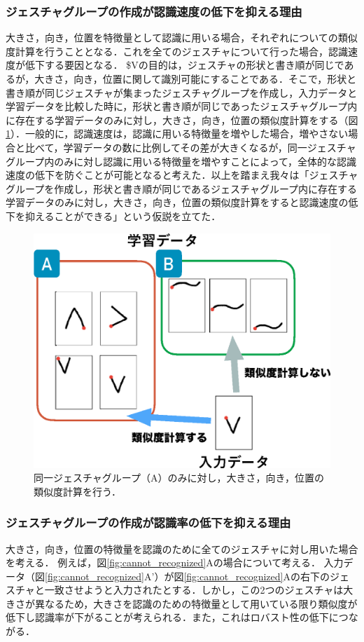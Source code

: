 \subsubsection{ジェスチャグループの作成が認識速度の低下を抑える理由}

大きさ，向き，位置を特徴量として認識に用いる場合，それぞれについての類似度計算を行うこととなる．これを全てのジェスチャについて行った場合，認識速度が低下する要因となる．
\$Vの目的は，ジェスチャの形状と書き順が同じであるが，大きさ，向き，位置に関して識別可能にすることである．そこで，形状と書き順が同じジェスチャが集まったジェスチャグループを作成し，入力データと学習データを比較した時に，形状と書き順が同じであったジェスチャグループ内に存在する学習データのみに対し，大きさ，向き，位置の類似度計算をする（図\ref{fig:speed_reason}）．一般的に，認識速度は，認識に用いる特徴量を増やした場合，増やさない場合と比べて，学習データの数に比例してその差が大きくなるが，同一ジェスチャグループ内のみに対し認識に用いる特徴量を増やすことによって，全体的な認識速度の低下を防ぐことが可能となると考えた．以上を踏まえ我々は「ジェスチャグループを作成し，形状と書き順が同じであるジェスチャグループ内に存在する学習データのみに対し，大きさ，向き，位置の類似度計算をすると認識速度の低下を抑えることができる」という仮説を立てた．

\begin{figure} [h!]
	\begin{center}
		\includegraphics [width=0.55\hsize ]{img/speed_reason.eps}
	\end{center}
	\caption{同一ジェスチャグループ（A）のみに対し，大きさ，向き，位置の類似度計算を行う．}
	\label{fig:speed_reason}
\end{figure}

\subsubsection{ジェスチャグループの作成が認識率の低下を抑える理由}

大きさ，向き，位置の特徴量を認識のために全てのジェスチャに対し用いた場合を考える．
例えば，図\ref{fig:cannot_recognized}Aの場合について考える．
入力データ（図\ref{fig:cannot_recognized}A'）が図\ref{fig:cannot_recognized}Aの右下のジェスチャと一致させようと入力されたとする．しかし，この2つのジェスチャは大きさが異なるため，大きさを認識のための特徴量として用いている限り類似度が低下し認識率が下がることが考えられる．また，これはロバスト性の低下につながる．

